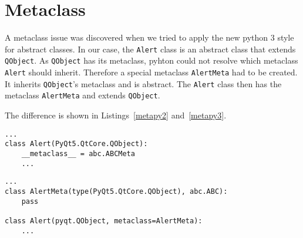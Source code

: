 \section{Metaclass}

A metaclass issue was discovered when we tried to apply the new python 3 style
for abstract classes. In our case, the \texttt{Alert} class is an abstract class
that extends \texttt{QObject}. As \texttt{QObject} has its metaclass, pyhton
could not resolve which metaclass \texttt{Alert} should inherit. Therefore a
special metaclass \texttt{AlertMeta} had to be created. It inherits
\texttt{QObject}'s metaclass and is abstract. The \texttt{Alert} class then
has the metaclass \texttt{AlertMeta} and extends
\texttt{QObject}.~\cite{sim2017meta,maries2015meta}

The difference is shown in Listings~\ref{metapy2} and~\ref{metapy3}.

\begin{lstlisting}
...
class Alert(PyQt5.QtCore.QObject):
    __metaclass__ = abc.ABCMeta
    ...
\end{lstlisting}

\begin{lstlisting}
...
class AlertMeta(type(PyQt5.QtCore.QObject), abc.ABC):
    pass

class Alert(pyqt.QObject, metaclass=AlertMeta):
    ...
\end{lstlisting}
